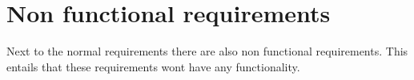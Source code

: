 \section{Non functional requirements}
Next to the normal requirements there are also non functional requirements. This entails that these requirements wont have any functionality.


